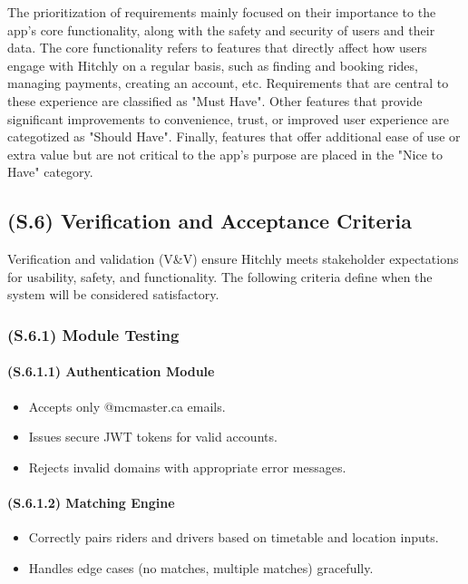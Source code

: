\documentclass[12pt,letterpaper]{article}
\begin{document}
\vspace{2em}

\par\raggedright
  The prioritization of requirements mainly focused on their importance to the app's core functionality, along with the safety and security of users and their data. 
  The core functionality refers to features that directly affect how users engage with Hitchly on a regular basis, such as finding and booking rides,
  managing payments, creating an account, etc. Requirements that are central to these experience are classified as "Must Have". Other features that provide
  significant improvements to convenience, trust, or improved user experience are categotized as "Should Have". Finally, features that offer additional ease of use
  or extra value but are not critical to the app's purpose are placed in the "Nice to Have" category.

\subsection{(S.6) Verification and Acceptance Criteria} %

Verification and validation (V\&V) ensure Hitchly meets stakeholder expectations for usability, safety, and functionality. The following criteria define when the system will be considered satisfactory.

\subsubsection{(S.6.1) Module Testing} %

\paragraph{(S.6.1.1) Authentication Module} %
\begin{itemize}
    \item Accepts only @mcmaster.ca emails.
    \item Issues secure JWT tokens for valid accounts.
    \item Rejects invalid domains with appropriate error messages.
\end{itemize}

\paragraph{(S.6.1.2) Matching Engine} %
\begin{itemize}
    \item Correctly pairs riders and drivers based on timetable and location inputs.
    \item Handles edge cases (no matches, multiple matches) gracefully.
\end{itemize}
\end{document}

